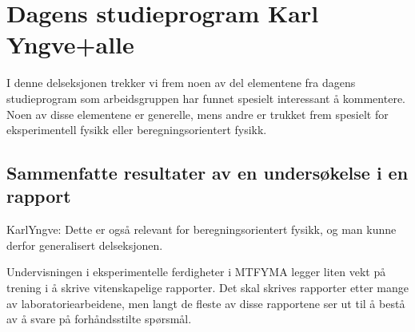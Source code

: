 \documentclass{article}
\begin{document}




\section{Dagens studieprogram {\color{red} Karl Yngve+alle}}
\label{Sammenlikning}

I denne delseksjonen trekker vi frem noen av del elementene fra dagens studieprogram som arbeidsgruppen har funnet spesielt interessant å kommentere.
Noen av disse elementene er generelle, mens andre er trukket frem spesielt for eksperimentell fysikk eller beregningsorientert fysikk.

\subsection{Sammenfatte resultater av en undersøkelse i en rapport}
\label{Rapport}
{\color{red} KarlYngve: Dette er også relevant for beregningsorientert fysikk, og man kunne derfor generalisert delseksjonen.}

Undervisningen i eksperimentelle ferdigheter i MTFYMA legger liten vekt på trening i å skrive vitenskapelige rapporter. Det skal skrives rapporter etter mange av laboratoriearbeidene, men langt de fleste av disse rapportene ser ut til å bestå av å svare på forhåndsstilte spørsmål.
\end{document}
